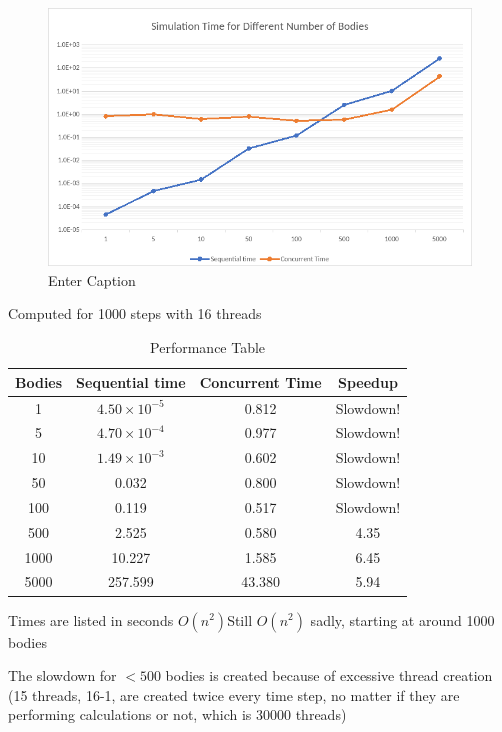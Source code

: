 \documentclass{article}
\begin{document}
\begin{figure}
        \centering
        \includegraphics[width=1\linewidth]{graph.png}
        \caption{Enter Caption}
        \label{fig:enter-label}
\end{figure}
Computed for 1000 steps with 16 threads



\begin{table}[h]  
  \centering
  \begin{tabular}{|c|c|c|c|}
    \hline
    Bodies & Sequential time & Concurrent Time & Speedup \\ \hline
    1 & $4.50\times 10^{-5}$ & 0.812 & Slowdown! \\ \hline
    5 & $4.70\times 10^{-4}$ & 0.977 & Slowdown! \\ \hline
    10 & $1.49\times 10^{-3}$ & 0.602 & Slowdown! \\ \hline
    50 & 0.032 & 0.800 & Slowdown! \\ \hline
    100 & 0.119 & 0.517 & Slowdown! \\ \hline
    500 & 2.525 & 0.580 & 4.35 \\ \hline
    1000 & 10.227 & 1.585 & 6.45 \\ \hline
    5000 & 257.599 & 43.380 & 5.94 \\ \hline
  \end{tabular}
  \caption{Performance Table}
  \label{tab:performance_table}
\end{table}


Times are listed in seconds
$O(n^2)	$Still $O(n^2)$ sadly, starting at around 1000 bodies				
						
The slowdown for $<500$ bodies is created because of excessive thread creation (15 threads, 16-1, are created twice every time step, no matter if they are performing calculations or not, which is 30000 threads)					
\end{document}
